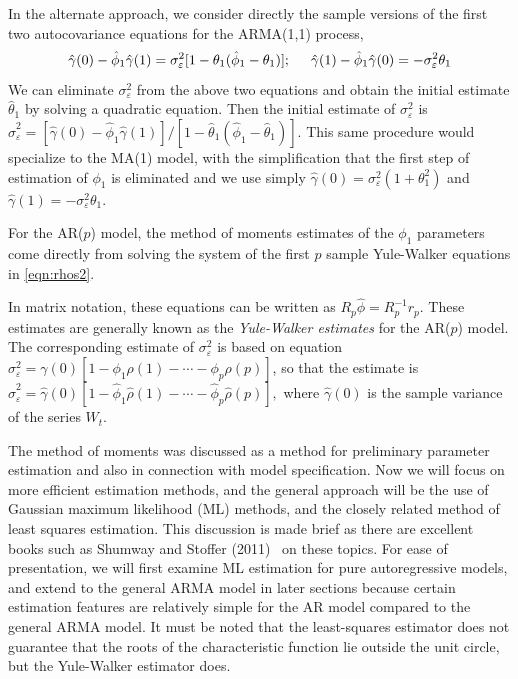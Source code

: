 In the alternate approach, we consider directly the sample versions of the first two autocovariance equations for the ARMA(1,1) process,
	\[
	\hat{\gamma}(0) - \hat{\phi}_1\hat{\gamma}(1) = \sigma_{\varepsilon}^2[1 - \theta_1(\hat{\phi}_1 - \theta_1)]; \hspace{0.5cm}  \hat{\gamma}(1) - \hat{\phi}_1\hat{\gamma}(0) = -\sigma_{\varepsilon}^2\theta_1
	\]
We can eliminate $\sigma_{\varepsilon}^2$ from the above two equations and obtain the initial estimate $\hat{\theta}_1$ by solving a quadratic equation. Then the initial estimate of $\sigma_{\varepsilon}^2$ is $\hat{\sigma}_{\varepsilon}^2 = [\hat{\gamma}(0) - \hat{\phi}_1\hat{\gamma}(1)]/[1 - \hat{\theta}_1(\hat{\phi}_1 - \hat{\theta}_1)]$. This same procedure would specialize to the MA(1) model, with the simplification that the first step of estimation of $\phi_1$ is eliminated and we use simply $\hat{\gamma}(0) = \sigma_{\varepsilon}^2(1 + \theta_1^2)$ and $\hat{\gamma}(1) = -\sigma_{\varepsilon}^2\theta_1$.


\begin{ex}[AR($p$) Model]
 For the AR($p$) model, the method of moments estimates of the $\phi_1$ parameters come directly from solving the system of the first $p$ sample Yule-Walker equations in \ref{eqn:rhos2}.

In matrix notation, these equations can be written as $R_p\hat{\phi} = R_p^{-1}r_p$. These estimates are generally known as the \textit{Yule-Walker estimates} for the AR($p$) model. The corresponding estimate of $\sigma_{\varepsilon}^2$ is based on equation $\sigma_{\varepsilon}^2 = \gamma(0)[1 - \phi_1\rho(1) - \cdots - \phi_p\rho(p)]$, so that the estimate is $\hat{\sigma}_{\varepsilon}^2 = \hat{\gamma}(0)[1 - \hat{\phi}_1\hat{\rho}(1) - \cdots - \hat{\phi}_p\hat{\rho}(p)],$ where $\hat{\gamma}(0)$ is the sample variance of the series $W_t$.
\end{ex}


The method of moments was discussed as a method for preliminary parameter estimation and also in connection with model specification. Now we will focus on more efficient estimation methods, and the general approach will be the use of Gaussian maximum likelihood (ML) methods, and the closely related method of least squares estimation. This discussion is made brief as there are excellent books such as Shumway and Stoffer (2011)~\cite{shumway2011arima} on these topics. For ease of presentation, we will first examine ML estimation for pure autoregressive models, and extend to the general ARMA model in later sections because certain estimation features are relatively simple for the AR model compared to the general ARMA model. It must be noted that the least-squares estimator does not guarantee that the roots of the characteristic function lie outside the unit circle, but the Yule-Walker estimator does. \\



